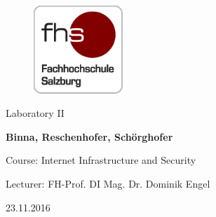 \begin{titlepage}

\hspace{7cm}

\begin{figure}[!ht]
	\centering
	\includegraphics[width=0.3\textwidth]{fhs_logo_web.png}
\end{figure}

\begin{center}
	\vspace{2cm}
	\Huge Laboratory II
	
	\Large{\bf\large Binna, Reschenhofer, Schörghofer}
	\vspace{1cm}

	\large Course: Internet Infrastructure and Security 
	
	\large Lecturer: FH-Prof. DI Mag. Dr. Dominik Engel 
	
	\large 23.11.2016
\end{center}

\end{titlepage}